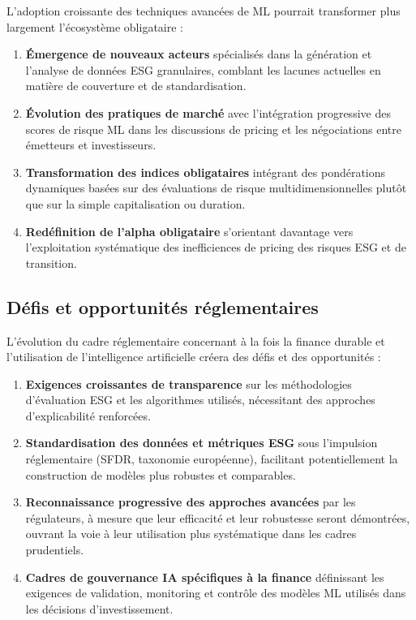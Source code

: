 L'adoption croissante des techniques avancées de ML pourrait transformer plus largement l'écosystème obligataire :

\begin{enumerate}
  \item \textbf{Émergence de nouveaux acteurs} spécialisés dans la génération et l'analyse de données ESG granulaires, comblant les lacunes actuelles en matière de couverture et de standardisation.

  \item \textbf{Évolution des pratiques de marché} avec l'intégration progressive des scores de risque ML dans les discussions de pricing et les négociations entre émetteurs et investisseurs.

  \item \textbf{Transformation des indices obligataires} intégrant des pondérations dynamiques basées sur des évaluations de risque multidimensionnelles plutôt que sur la simple capitalisation ou duration.

  \item \textbf{Redéfinition de l'alpha obligataire} s'orientant davantage vers l'exploitation systématique des inefficiences de pricing des risques ESG et de transition.
\end{enumerate}

\subsection*{Défis et opportunités réglementaires}

L'évolution du cadre réglementaire concernant à la fois la finance durable et l'utilisation de l'intelligence artificielle créera des défis et des opportunités :

\begin{enumerate}
  \item \textbf{Exigences croissantes de transparence} sur les méthodologies d'évaluation ESG et les algorithmes utilisés, nécessitant des approches d'explicabilité renforcées.

  \item \textbf{Standardisation des données et métriques ESG} sous l'impulsion réglementaire (SFDR, taxonomie européenne), facilitant potentiellement la construction de modèles plus robustes et comparables.

  \item \textbf{Reconnaissance progressive des approches avancées} par les régulateurs, à mesure que leur efficacité et leur robustesse seront démontrées, ouvrant la voie à leur utilisation plus systématique dans les cadres prudentiels.

  \item \textbf{Cadres de gouvernance IA spécifiques à la finance} définissant les exigences de validation, monitoring et contrôle des modèles ML utilisés dans les décisions d'investissement.
\end{enumerate}

